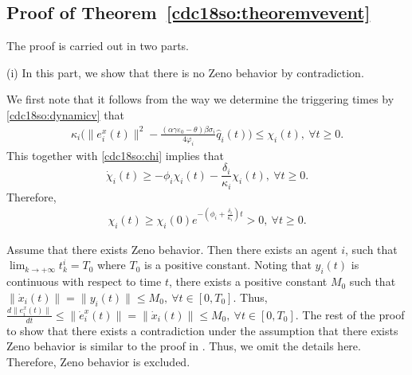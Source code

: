 \documentclass[letterpaper, 10 pt, conference]{ieeeconf}  %
\begin{document}


\subsection{Proof of Theorem~\ref{cdc18so:theoremvevent}}\label{cdc18so:theoremveventproof}
The proof is carried out in two parts.

(i) In this part, we show that there is no Zeno behavior by contradiction.

We first note that it follows from the way we determine the triggering times by \eqref{cdc18so:dynamicv} that
\begin{align}\label{cdc18so:dynamicv2}
\kappa_i\Big(\|e^{x}_i(t)\|^2 -\frac{(\alpha\gamma\varepsilon_0-\theta)\beta\sigma_i}{4\varphi_i}\hat{q}_i(t)\Big)\le \chi_i(t),~\forall t\ge0.
\end{align}
This together with \eqref{cdc18so:chi} implies that
$$\dot{\chi}_i(t)\ge -\phi_i\chi_i(t)-\frac{\delta_i}{\kappa_i}\chi_i(t),~\forall t\ge0.$$
Therefore,
\begin{align*}%
\chi_i(t)\ge\chi_i(0)e^{-(\phi_i+\frac{\delta_i}{\kappa_i})t}>0,~\forall t\ge0.
\end{align*}

Assume that there exists Zeno behavior. Then there exists an agent $i$, such that $\lim_{k\rightarrow+\infty}t^i_k=T_0$ where $T_0$ is a positive constant. Noting that  $y_i(t)$ is continuous with respect to time $t$, there exists a positive constant $M_0$ such that $\|\dot{x}_i(t)\|=\|y_i(t)\|\le M_0,~\forall t\in[0,T_0]$. Thus, $\frac{d\|e^{x}_i(t)\|}{dt}\le\|\dot{e}^{x}_i(t)\|=\|\dot{x}_i(t)\|\le M_0,~\forall t\in[0,T_0]$. The rest of the proof to show that there exists a contradiction under the assumption that there exists Zeno behavior is similar to the proof in \cite{yi2017distributed}. Thus, we omit the details here. Therefore, Zeno behavior is excluded.
\end{document}
